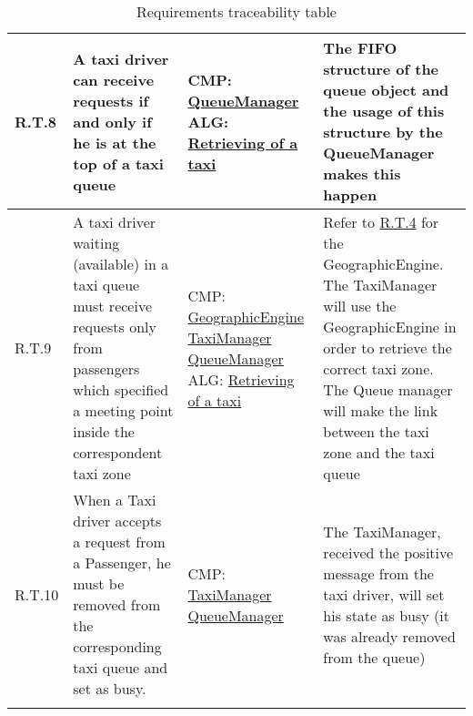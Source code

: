 \begin{center}
\begin{longtable}{|p{}|p{}|>{\raggedright\arraybackslash}p{}|>{\raggedright\arraybackslash}p{}|}
R.T.8 & A taxi driver can receive requests if and only if he is at the top of a taxi queue & CMP: \linebreak \hyperref[comp:queueManager]{QueueManager} \linebreak ALG:  \linebreak \hyperref[alg:retrievingOfATaxi]{Retrieving of a taxi} & The FIFO structure of the queue object and the usage of this structure by the QueueManager makes this happen \\ \hline
R.T.9 & A taxi driver waiting (available) in a taxi queue must receive requests only from passengers which specified a meeting point inside the correspondent taxi zone & CMP: \linebreak \hyperref[comp:geographicEngine]{GeographicEngine} \linebreak \hyperref[comp:taxiManager]{TaxiManager} \linebreak \hyperref[comp:queueManager]{QueueManager} \linebreak ALG: \linebreak \hyperref[alg:retrievingOfATaxi]{Retrieving of a taxi} & Refer to \hyperref[R.T.4]{R.T.4} for the GeographicEngine. \linebreak The TaxiManager will use the GeographicEngine in order to retrieve the correct taxi zone. \linebreak The Queue manager will make the link between the taxi zone and the taxi queue  \\ \hline
R.T.10 & When a Taxi driver accepts a request from a Passenger, he must be removed from the corresponding taxi queue and set as busy. & CMP: \linebreak \hyperref[comp:taxiManager]{TaxiManager} \linebreak \hyperref[comp:queueManager]{QueueManager} & The TaxiManager, received the positive message from the taxi driver, will set his state as busy (it was already removed from the queue) \\ \hline
\caption{Requirements traceability table} 
\label{tab:reqTraceTable}
\end{longtable} 
\end{center}